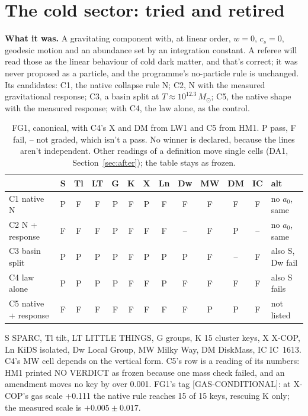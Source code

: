 \documentclass[10pt]{article}
\begin{document}
\section{The cold sector: tried and retired}\label{sec:cold}
\textbf{What it was.} A gravitating component with, at linear order, $w=0$, $c_s=0$, geodesic motion and an abundance set by an integration constant. A referee will read those as the linear behaviour of cold dark matter, and that's correct; it was never proposed as a particle, and the programme's no-particle rule is unchanged. Its candidates: C1, the native collapse rule N; C2, N with the measured gravitational response; C3, a basin split at $T\approx10^{12.3}\,M_\odot$; C5, the native shape with the measured response; with C4, the law alone, as the control.

\begin{table}[h]\centering\small
\caption{FG1, canonical, with C4's X and DM from LW1 and C5 from HM1. P pass, F fail, -- not graded, which isn't a pass. No winner is declared, because the lines aren't independent. Other readings of a definition move single cells (DA1, Section~\ref{sec:after}); the table stays as frozen.}\label{tab:fg1}
\begin{tabular}{lcccccccccccl}
\toprule
 & S & Tl & LT & G & K & X & Ln & Dw & MW & DM & IC & alt\\
\midrule
C1 native N & P & F & F & P & F & P & F & F & F & F & F & no $a_0$, same\\
C2 N + response & F & F & F & P & F & F & F & -- & F & P & -- & no $a_0$, same\\
C3 basin split & P & P & P & P & F & P & P & P & F & -- & F & also S, Dw fail\\
C4 law alone & P & P & P & P & F & F & P & F & F & F & F & also S fails\\
C5 native + response & F & F & F & F & F & F & F & F & P & P & F & not listed\\
\bottomrule
\end{tabular}
\end{table}
S SPARC, Tl tilt, LT LITTLE THINGS, G groups, K 15 cluster keys, X X-COP, Ln KiDS isolated, Dw Local Group, MW Milky Way, DM DiskMass, IC IC~1613. C4's MW cell depends on the vertical form. C5's row is a reading of its numbers: HM1 printed NO VERDICT as frozen because one mass check failed, and an amendment moves no key by over 0.001. FG1's tag [GAS-CONDITIONAL]: at X-COP's gas scale +0.111 the native rule reaches 15 of 15 keys, rescuing K only; the measured scale is $+0.005\pm0.017$.
\end{document}
